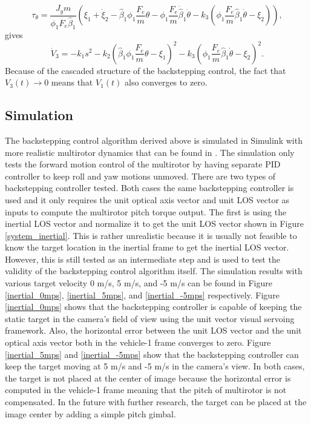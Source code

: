 \begin{equation}
\tau_\theta=\frac{J_ym}{\phi_1F_e\hat{\beta}_1}
(\xi_1+\dot{\xi}_2-\hat{\beta}_1\phi_1\frac{F_e}{m}\theta-\phi_1\frac{F_e}{m}\dot{\hat{\beta}}_1\dot{\theta}-k_3(\phi_1\frac{F_e}{m}\hat{\beta}_1\dot{\theta}-\xi_2)),
\end{equation}
gives
\begin{equation}
\dot{V}_3=-k_1s^2-k_2(\hat{\beta}_1\phi_1\frac{F_e}{m}\theta-\xi_1)^2-k_3(\phi_1\frac{F_e}{m}\hat{\beta}_1\dot{\theta}-\xi_2)^2.
\end{equation}
Because of the cascaded structure of the backstepping control, the fact that $V_3(t)\rightarrow 0$ means that $V_1(t)$ also converges to zero.

\subsection{Simulation}
The backstepping control algorithm derived above is simulated in Simulink with more realistic multirotor dynamics that can be found in {\cite{Beard2008}}. The simulation only tests the forward motion control of the multirotor by having separate PID controller to keep roll and yaw motions unmoved. There are two types of backstepping controller tested. Both cases the same backstepping controller is used and it only requires the unit optical axis vector and unit LOS vector as inputs to compute the multirotor pitch torque output. The first is using the inertial LOS vector and normalize it to get the unit LOS vector shown in Figure \ref{system_inertial}. This is rather unrealistic because it is usually not feasible to know the target location in the inertial frame to get the inertial LOS vector. However, this is still tested as an intermediate step and is used to test the validity of the backstepping control algorithm itself. The simulation results with various target velocity 0 m/s, 5 m/s, and -5 m/s can be found in Figure \ref{inertial_0mps}, \ref{inertial_5mps}, and \ref{inertial_-5mps} respectively. Figure \ref{inertial_0mps} shows that the backstepping controller is capable of keeping the static target in the camera's field of view using the unit vector visual servoing framework. Also, the horizontal error between the unit LOS vector and the unit optical axis vector both in the vehicle-1 frame converges to zero. Figure \ref{inertial_5mps} and \ref{inertial_-5mps} show that the backstepping controller can keep the target moving at 5 m/s and -5 m/s in the camera's view. In both cases, the target is not placed at the center of image because the horizontal error is computed in the vehicle-1 frame meaning that the pitch of multirotor is not compensated. In the future with further research, the target can be placed at the image center by adding a simple pitch gimbal. 
